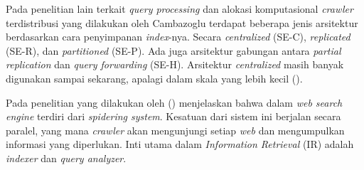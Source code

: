 
Pada penelitian lain terkait \emph{query processing} dan alokasi komputasional \emph{crawler} terdistribusi yang dilakukan oleh Cambazoglu terdapat beberapa jenis arsitektur berdasarkan cara penyimpanan \emph{index}-nya. Secara \emph{centralized} (SE-C), \emph{replicated} (SE-R), dan \emph{partitioned} (SE-P). Ada juga arsitektur gabungan antara \emph{partial replication} dan \emph{query forwarding} (SE-H). Arsitektur \emph{centralized} masih banyak digunakan sampai sekarang, apalagi dalam skala yang lebih kecil (\cite{cambazoglu2009quantifying}).





Pada penelitian yang dilakukan oleh (\cite{orlando2002design}) menjelaskan bahwa dalam \emph{web search engine} terdiri dari \emph{spidering system}. Kesatuan dari sistem ini berjalan secara paralel, yang mana \emph{crawler} akan mengunjungi setiap \emph{web} dan mengumpulkan informasi yang diperlukan. Inti utama dalam \emph{Information Retrieval} (IR) adalah \emph{indexer} dan \emph{query analyzer}. 

